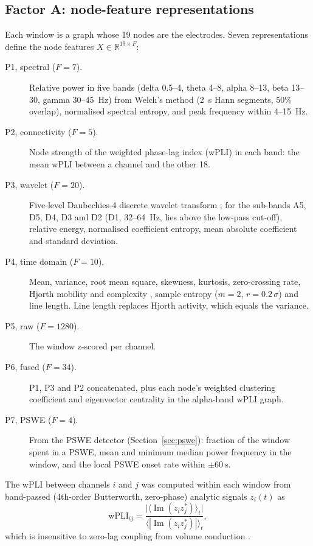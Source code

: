 \subsection{Factor A: node-feature representations}\label{sec:reps}
Each window is a graph whose 19 nodes are the electrodes. Seven representations define the node
features $X\in\mathbb{R}^{19\times F}$:
\begin{description}
  \item[P1, spectral ($F=7$).] Relative power in five bands (delta 0.5--4, theta 4--8, alpha 8--13,
        beta 13--30, gamma 30--45~Hz) from Welch's method \cite{welch}
        (\SI{2}{\second} Hann segments, 50\% overlap), normalised spectral entropy, and peak
        frequency within 4--15~Hz.
  \item[P2, connectivity ($F=5$).] Node strength of the weighted phase-lag index (wPLI)
        \cite{wpli,F11} in each band: the mean wPLI between a channel and the other 18.
  \item[P3, wavelet ($F=20$).] Five-level Daubechies-4 discrete wavelet transform \cite{pywavelets};
        for the sub-bands A5, D5, D4, D3 and D2 (D1, 32--\SI{64}{\hertz}, lies above the low-pass
        cut-off), relative energy, normalised coefficient entropy, mean absolute coefficient and
        standard deviation.
  \item[P4, time domain ($F=10$).] Mean, variance, root mean square, skewness, kurtosis, zero-crossing
        rate, Hjorth mobility and complexity \cite{hjorth}, sample entropy \cite{sampen} ($m=2$,
        $r=0.2\,\sigma$) and line length. Line length replaces Hjorth activity, which equals the
        variance.
  \item[P5, raw ($F=1280$).] The window z-scored per channel.
  \item[P6, fused ($F=34$).] P1, P3 and P2 concatenated, plus each node's weighted clustering
        coefficient \cite{onnela} and eigenvector centrality in the alpha-band wPLI graph.
  \item[P7, PSWE ($F=4$).] From the PSWE detector (Section~\ref{sec:pswe}): fraction of the window
        spent in a PSWE, mean and minimum median power frequency in the window, and the local PSWE
        onset rate within $\pm\SI{60}{\second}$.
\end{description}

The wPLI between channels $i$ and $j$ was computed within each window from band-passed (4th-order
Butterworth, zero-phase) analytic signals $z_i(t)$ as
\begin{equation}
  \mathrm{wPLI}_{ij} = \frac{\bigl|\langle \operatorname{Im}(z_i z_j^{*})\rangle_t\bigr|}
                            {\langle |\operatorname{Im}(z_i z_j^{*})| \rangle_t},
\end{equation}
which is insensitive to zero-lag coupling from volume conduction \cite{wpli}.

